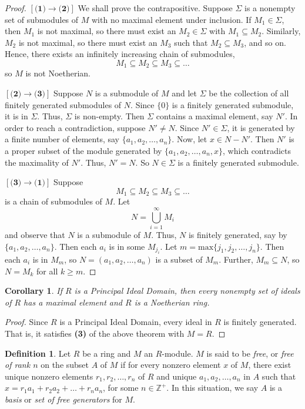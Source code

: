 \documentclass[12pt,leqno]{article}
\numberwithin{equation}{section}
\newtheorem{cor}[thm]{Corollary}
\theoremstyle{definition}
\newtheorem*{Def}{Definition}
\begin{document}
\begin{proof}
 $[\textbf{(1)}\rightarrow\textbf{(2)}]$ We shall prove the contrapositive. Suppose $\Sigma$ is a nonempty set of submodules of $M$ with no maximal element under inclusion. If $M_1\in\Sigma$, then $M_1$ is not maximal, so there must exist an $M_2\in\Sigma$ with $M_1\subseteq M_2$. Similarly, $M_2$ is not maximal, so there must exist an $M_3$ such that $M_2\subseteq M_3$, and so on. Hence, there exists an infinitely increasing chain of submodules, \[M_1\subseteq M_2\subseteq M_3\subseteq\hdots\] so $M$ is not Noetherian.

$[\textbf{(2)}\rightarrow\textbf{(3)}]$ Suppose $N$ is a submodule of $M$ and let $\Sigma$ be the collection of all finitely generated submodules of $N$. Since $\{0\}$ is a finitely generated submodule, it is in $\Sigma$. Thus, $\Sigma$ is non-empty. Then $\Sigma$ contains a maximal element, say $N'$. In order to reach a contradiction, suppose $N'\not=N$. Since $N'\in\Sigma$, it is generated by a finite number of elements, say $\{a_1,a_2,\hdots,a_n\}$. Now, let $x\in N-N'$. Then $N'$ is a proper subset of the module generated by $\{a_1,a_2,\hdots,a_n,x\}$, which contradicts the maximality of $N'$. Thus, $N'=N$. So $N\in\Sigma$ is a finitely generated submodule.

$[\textbf{(3)}\rightarrow\textbf{(1)}]$ Suppose \[M_1\subseteq M_2\subseteq M_3\subseteq\hdots\] is a chain of submodules of $M$. Let \[N=\bigcup_{i=1}^{\infty}M_i\] and observe that $N$ is a submodule of $M$. Thus, $N$ is finitely generated, say by $\{a_1,a_2,\hdots,a_n\}$. Then each $a_i$ is in some $M_{j_i}$. Let $m=\text{max}\{j_1,j_2,\hdots,j_n\}$. Then each $a_i$ is in $M_m$, so $N=(a_1,a_2,\hdots,a_n)$ is a subset of $M_m$. Further, $M_m\subseteq N$, so $N=M_k$ for all $k\geq m$.
\end{proof}

\begin{cor}
 If $R$ is a Principal Ideal Domain, then every nonempty set of ideals of $R$ has a maximal element and $R$ is a Noetherian ring.
\end{cor}

\begin{proof}
 Since $R$ is a Principal Ideal Domain, every ideal in $R$ is finitely generated. That is, it satisfies \textbf{(3)} of the above theorem with $M=R$.
\end{proof}

\begin{Def}
Let $R$ be a ring and $M$ an $R$-module. $M$ is said to be \textit{free}, or \textit{free of rank $n$} on the subset $A$ of $M$ if for every nonzero element $x$ of $M$, there exist unique nonzero elements $r_1,r_2,\hdots,r_n$ of $R$ and unique $a_1,a_2,\hdots,a_n$ in $A$ such that $x=r_1a_1+r_2a_2+\hdots+r_na_n$, for some $n\in\mathbb{Z}^+$. In this situation, we say $A$ is a \textit{basis} or \textit{set of free generators} for $M$.
\end{Def}
\end{document}
